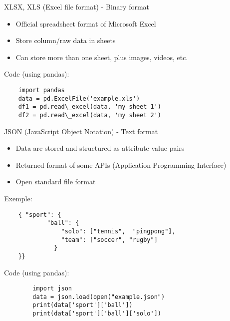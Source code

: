 \documentclass[handout]{beamer}[10pt, usepdftitle=false]
\begin{document}
	\begin{frame}[fragile]
	XLSX, XLS (Excel file format) - Binary format
	\vspace*{0.6em}
	
	\begin{itemize}
	\item{Official spreadsheet format of Microsoft Excel}
	\item{Store column/raw data in sheets}
	\item{Can store more than one sheet, plus images, videos, etc.}
	\end{itemize}
	\vspace*{0.6em}

	Code (using pandas):
	\begin{verbatim}
	import pandas
	data = pd.ExcelFile('example.xls')
	df1 = pd.read\_excel(data, 'my sheet 1')
	df2 = pd.read\_excel(data, 'my sheet 2')	
	\end{verbatim}
			
	\end{frame}
	\begin{frame}[fragile]
	
	JSON (JavaScript Object Notation) - Text format
	\vspace*{0.6em}
	
	\begin{itemize}
	\item{Data are stored and structured as attribute-value pairs}
	\item{Returned format of some APIs (Application Programming Interface)}
	\item{Open standard file format}
	\end{itemize}		
	
	Exemple:
	\vspace*{0.6em}
	
	\begin{verbatim}
	{ "sport": {
            "ball": {
                "solo": ["tennis",	"pingpong"],
                "team": ["soccer", "rugby"]
              }
    }}
	\end{verbatim}
	Code (using pandas):
	\begin{verbatim}
		import json
		data = json.load(open("example.json")
		print(data['sport']['ball'])	
		print(data['sport']['ball']['solo'])	
	\end{verbatim}
	
	\end{frame}
\end{document}
